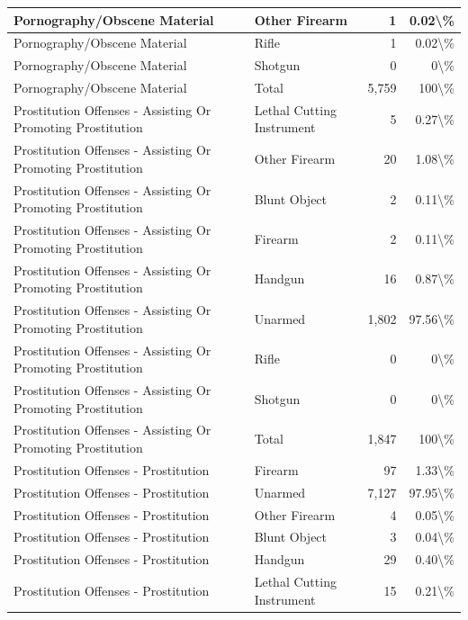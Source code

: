 \documentclass[
]{krantz}
\begin{document}
\begin{longtable}[t]{l|l|r|r}
\hline
Pornography/Obscene Material & Other Firearm & 1 & 0.02\textbackslash{}\%\\
\hline
Pornography/Obscene Material & Rifle & 1 & 0.02\textbackslash{}\%\\
\hline
Pornography/Obscene Material & Shotgun & 0 & 0\textbackslash{}\%\\
\hline
Pornography/Obscene Material & Total & 5,759 & 100\textbackslash{}\%\\
\hline
Prostitution Offenses - Assisting Or Promoting Prostitution & Lethal Cutting Instrument & 5 & 0.27\textbackslash{}\%\\
\hline
Prostitution Offenses - Assisting Or Promoting Prostitution & Other Firearm & 20 & 1.08\textbackslash{}\%\\
\hline
Prostitution Offenses - Assisting Or Promoting Prostitution & Blunt Object & 2 & 0.11\textbackslash{}\%\\
\hline
Prostitution Offenses - Assisting Or Promoting Prostitution & Firearm & 2 & 0.11\textbackslash{}\%\\
\hline
Prostitution Offenses - Assisting Or Promoting Prostitution & Handgun & 16 & 0.87\textbackslash{}\%\\
\hline
Prostitution Offenses - Assisting Or Promoting Prostitution & Unarmed & 1,802 & 97.56\textbackslash{}\%\\
\hline
Prostitution Offenses - Assisting Or Promoting Prostitution & Rifle & 0 & 0\textbackslash{}\%\\
\hline
Prostitution Offenses - Assisting Or Promoting Prostitution & Shotgun & 0 & 0\textbackslash{}\%\\
\hline
Prostitution Offenses - Assisting Or Promoting Prostitution & Total & 1,847 & 100\textbackslash{}\%\\
\hline
Prostitution Offenses - Prostitution & Firearm & 97 & 1.33\textbackslash{}\%\\
\hline
Prostitution Offenses - Prostitution & Unarmed & 7,127 & 97.95\textbackslash{}\%\\
\hline
Prostitution Offenses - Prostitution & Other Firearm & 4 & 0.05\textbackslash{}\%\\
\hline
Prostitution Offenses - Prostitution & Blunt Object & 3 & 0.04\textbackslash{}\%\\
\hline
Prostitution Offenses - Prostitution & Handgun & 29 & 0.40\textbackslash{}\%\\
\hline
Prostitution Offenses - Prostitution & Lethal Cutting Instrument & 15 & 0.21\textbackslash{}\%\\

\end{longtable}
\end{document}
